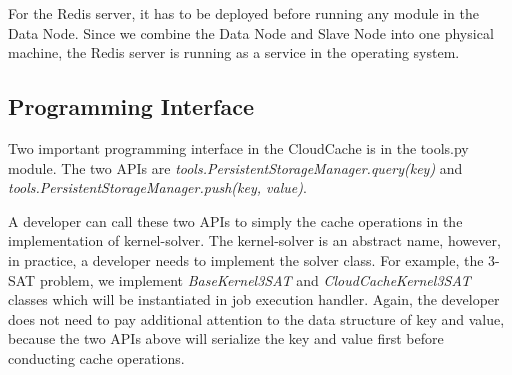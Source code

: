 For the Redis server, it has to be deployed before running any module in the Data Node. Since we combine the Data Node and Slave Node into one physical machine, the Redis server is running as a service in the operating system.

\subsection{Programming Interface}
Two important programming interface in the CloudCache is in the tools.py module. The two APIs are \emph{tools.PersistentStorageManager.query(key)} and \emph{tools.PersistentStorageManager.push(key, value)}. 

A developer can call these two APIs to simply the cache operations in the implementation of kernel-solver. The kernel-solver is an abstract name, however, in practice, a developer needs to implement the solver class. For example, the 3-SAT problem, we implement \emph{BaseKernel3SAT} and \emph{CloudCacheKernel3SAT} classes which will be instantiated in job execution handler. Again, the developer does not need to pay additional attention to the data structure of key and value, because the two APIs above will serialize the key and value first before conducting cache operations.
